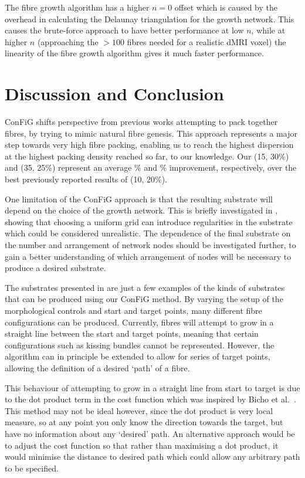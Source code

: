 The fibre growth algorithm has a higher $n=0$ offset which is caused by the overhead in calculating the Delaunay triangulation for the growth network.
This causes the brute-force approach to have better performance at low $n$, while at higher $n$ (approaching the $>100$ fibres needed for a realistic dMRI voxel) the linearity of the fibre growth algorithm gives it much faster performance. 



\section{Discussion and Conclusion}
\label{sec:config_discussion}
ConFiG shifts perspective from previous works attempting to pack together fibres, by trying to mimic natural fibre genesis. 
This approach represents a major step towards very high fibre packing, enabling us to reach the highest dispersion at the highest packing density reached so far, to our knowledge. Our (15\degree, 30\%) and (35\degree, 25\%) represent an average \% and \% improvement, respectively, over the best previously reported results of (10\degree, 20\%)\cite{Ginsburger2018}.

One limitation of the ConFiG approach is that the resulting substrate will depend on the choice of the growth network.
This is briefly investigated in , showing that choosing a uniform grid can introduce regularities in the substrate which could be considered unrealistic.
The dependence of the final substrate on the number and arrangement of network nodes should be investigated further, to gain a better understanding of which arrangement of nodes will be necessary to produce a desired substrate. 


The substrates presented in  are just a few examples of the kinds of substrates that can be produced using our ConFiG method.
By varying the setup of the morphological controls and start and target points, many different fibre configurations can be produced.
Currently, fibres will attempt to grow in a straight line between the start and target points, meaning that certain configurations such as kissing bundles cannot be represented.
However, the algorithm can in principle be extended to allow for series of target points, allowing the definition of a desired `path' of a fibre.

This behaviour of attempting to grow in a straight line from start to target is due to the dot product term in the cost function which was inspired by Bicho et al.\ \cite{Bicho2012}.
This method may not be ideal however, since the dot product is very local measure, so at any point you only know the direction towards the target, but have no information about any `desired' path. 
An alternative approach would be to adjust the cost function so that rather than maximising a dot product, it would minimise the distance to desired path which could allow any arbitrary path to be specified.

